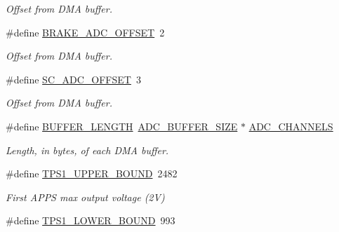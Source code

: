 \begin{DoxyCompactItemize}
\begin{DoxyCompactList}\small\item\em Offset from D\-M\-A buffer. \end{DoxyCompactList}\item 
\hypertarget{group___board__model__group_gade98eccd60c9b68cde78ca4c0009a84c}{\#define \hyperlink{group___board__model__group_gade98eccd60c9b68cde78ca4c0009a84c}{B\-R\-A\-K\-E\-\_\-\-A\-D\-C\-\_\-\-O\-F\-F\-S\-E\-T}~2}\label{group___board__model__group_gade98eccd60c9b68cde78ca4c0009a84c}

\begin{DoxyCompactList}\small\item\em Offset from D\-M\-A buffer. \end{DoxyCompactList}\item 
\hypertarget{group___board__model__group_ga58133efa918e1af6c0cc436137c78cc0}{\#define \hyperlink{group___board__model__group_ga58133efa918e1af6c0cc436137c78cc0}{S\-C\-\_\-\-A\-D\-C\-\_\-\-O\-F\-F\-S\-E\-T}~3}\label{group___board__model__group_ga58133efa918e1af6c0cc436137c78cc0}

\begin{DoxyCompactList}\small\item\em Offset from D\-M\-A buffer. \end{DoxyCompactList}\item 
\hypertarget{group___board__model__group_gaf7b7dc9a200cb1404c280bd500fd1551}{\#define \hyperlink{group___board__model__group_gaf7b7dc9a200cb1404c280bd500fd1551}{B\-U\-F\-F\-E\-R\-\_\-\-L\-E\-N\-G\-T\-H}~\hyperlink{group___board__model__group_ga602abb8ec84dcb3b6f854a738310ea46}{A\-D\-C\-\_\-\-B\-U\-F\-F\-E\-R\-\_\-\-S\-I\-Z\-E} $\ast$ \hyperlink{group___board__model__group_ga065dcfa648ca52ed6214008cb177de36}{A\-D\-C\-\_\-\-C\-H\-A\-N\-N\-E\-L\-S}}\label{group___board__model__group_gaf7b7dc9a200cb1404c280bd500fd1551}

\begin{DoxyCompactList}\small\item\em Length, in bytes, of each D\-M\-A buffer. \end{DoxyCompactList}\item 
\hypertarget{group___board__model__group_ga6741cba3daf129b6f73eed1b1db09519}{\#define \hyperlink{group___board__model__group_ga6741cba3daf129b6f73eed1b1db09519}{T\-P\-S1\-\_\-\-U\-P\-P\-E\-R\-\_\-\-B\-O\-U\-N\-D}~2482}\label{group___board__model__group_ga6741cba3daf129b6f73eed1b1db09519}

\begin{DoxyCompactList}\small\item\em First A\-P\-P\-S max output voltage (2\-V) \end{DoxyCompactList}\item 
\hypertarget{group___board__model__group_ga9c9aa914f6b372d9ef3f15ce4108da6a}{\#define \hyperlink{group___board__model__group_ga9c9aa914f6b372d9ef3f15ce4108da6a}{T\-P\-S1\-\_\-\-L\-O\-W\-E\-R\-\_\-\-B\-O\-U\-N\-D}~993}\label{group___board__model__group_ga9c9aa914f6b372d9ef3f15ce4108da6a}


\end{DoxyCompactItemize}
